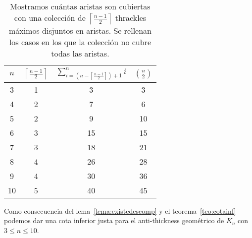   \begin{table}[t]
    \centering
    \begin{tabular}{|c|c|c|c|}
      \hline
      $n$ & $\left\lceil\frac{n-1}{2}\right\rceil$ &
      $\sum^n_{i=\left(n-\left\lceil\frac{n-1}{2}\right\rceil\right) + 1}i$ &
      $\binom{n}{2}$\\[5pt] \hline\hline
      3   & 1  & 3 & 3 \\ \hline
      4   & 2  & 7 & 6 \\ \hline
      5   & 2  & \cellcolor{red!25}9 & 10 \\ \hline
      6   & 3  & 15 & 15 \\ \hline
      7   & 3  & \cellcolor{red!25}18 & 21 \\ \hline
      8   & 4  & \cellcolor{red!25}26 & 28 \\ \hline
      9   & 4  & \cellcolor{red!25}30 & 36 \\ \hline
      10  & 5  & \cellcolor{red!25}40 & 45 \\ \hline
    \end{tabular}
    \caption{ Mostramos cuántas aristas son cubiertas con una colección de
    $\left\lceil\frac{n-1}{2}\right\rceil$ thrackles máximos disjuntos en
    aristas. Se rellenan los casos en los que la colección no cubre todas las
    aristas. }
    \label{table:attrivialtight}
  \end{table}

  Como consecuencia del lema~\ref{lema:existedescomp} y el teorema~\ref{teo:cotainf} podemos dar una cota inferior justa para el anti-thickness geométrico de $K_n$ con $3 \leq n \leq 10$.

